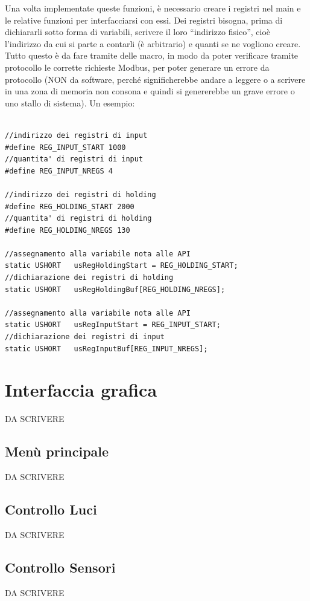 \documentclass[a4paper,titlepage]{book}
\begin{document}
Una volta implementate queste funzioni, è necessario creare i registri nel main e le relative funzioni per interfacciarsi con essi. Dei registri bisogna, prima di dichiararli sotto forma di variabili, scrivere il loro ``indirizzo fisico'', cioè l'indirizzo da cui si parte a contarli (è arbitrario) e quanti se ne vogliono creare. Tutto questo è da fare tramite delle macro, in modo da poter verificare tramite protocollo le corrette richieste Modbus, per poter generare un errore da protocollo (NON da software, perché significherebbe andare a leggere o a scrivere in una zona di memoria non consona e quindi si genererebbe un grave errore o uno stallo di sistema). Un esempio:

\begin{lstlisting}

//indirizzo dei registri di input
#define REG_INPUT_START 1000
//quantita' di registri di input	
#define REG_INPUT_NREGS 4	

//indirizzo dei registri di holding
#define REG_HOLDING_START 2000
//quantita' di registri di holding	
#define REG_HOLDING_NREGS 130	

//assegnamento alla variabile nota alle API
static USHORT   usRegHoldingStart = REG_HOLDING_START;
//dichiarazione dei registri di holding	
static USHORT   usRegHoldingBuf[REG_HOLDING_NREGS];	

//assegnamento alla variabile nota alle API
static USHORT   usRegInputStart = REG_INPUT_START;
//dichiarazione dei registri di input	
static USHORT   usRegInputBuf[REG_INPUT_NREGS];		

\end{lstlisting}


\section{Interfaccia grafica}

DA SCRIVERE

\subsection{Menù principale}
DA SCRIVERE
\subsection{Controllo Luci}
DA SCRIVERE
\subsection{Controllo Sensori}
DA SCRIVERE
\end{document}
